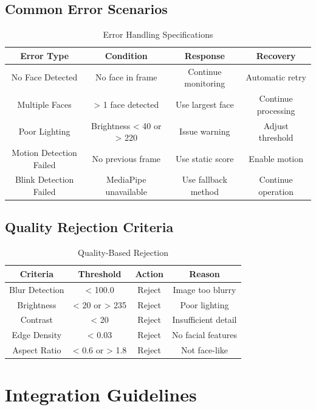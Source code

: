 \documentclass[12pt,a4paper]{article}
\begin{document}
\subsection{Common Error Scenarios}

\begin{table}[h!]
\centering
\caption{Error Handling Specifications}
\begin{tabular}{|c|c|c|c|}
\hline
\textbf{Error Type} & \textbf{Condition} & \textbf{Response} & \textbf{Recovery} \\
\hline
No Face Detected & No face in frame & Continue monitoring & Automatic retry \\
\hline
Multiple Faces & > 1 face detected & Use largest face & Continue processing \\
\hline
Poor Lighting & Brightness < 40 or > 220 & Issue warning & Adjust threshold \\
\hline
Motion Detection Failed & No previous frame & Use static score & Enable motion \\
\hline
Blink Detection Failed & MediaPipe unavailable & Use fallback method & Continue operation \\
\hline
\end{tabular}
\end{table}

\subsection{Quality Rejection Criteria}

\begin{table}[h!]
\centering
\caption{Quality-Based Rejection}
\begin{tabular}{|c|c|c|c|}
\hline
\textbf{Criteria} & \textbf{Threshold} & \textbf{Action} & \textbf{Reason} \\
\hline
Blur Detection & < 100.0 & Reject & Image too blurry \\
\hline
Brightness & < 20 or > 235 & Reject & Poor lighting \\
\hline
Contrast & < 20 & Reject & Insufficient detail \\
\hline
Edge Density & < 0.03 & Reject & No facial features \\
\hline
Aspect Ratio & < 0.6 or > 1.8 & Reject & Not face-like \\
\hline
\end{tabular}
\end{table}

\section{Integration Guidelines}
\end{document}
